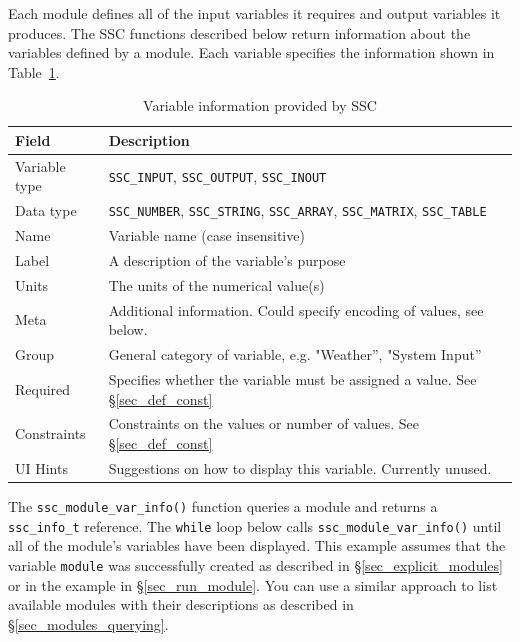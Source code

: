 \documentclass{scrartcl} %
\begin{document}
Each module defines all of the input variables it requires and output variables it produces. The SSC functions described below return information about the variables defined by a module. Each variable specifies the information shown in Table~\ref{tab_varinfo}.

\begin{table}[ht]
\begin{center}
\begin{tabular}{ll}
Field & Description\\
\hline
Variable type & \texttt{SSC\_INPUT}, \texttt{SSC\_OUTPUT}, \texttt{SSC\_INOUT} \\
Data type & \texttt{SSC\_NUMBER}, \texttt{SSC\_STRING}, \texttt{SSC\_ARRAY}, \texttt{SSC\_MATRIX}, \texttt{SSC\_TABLE} \\
Name & Variable name (case insensitive) \\
Label & A description of the variable's purpose \\
Units & The units of the numerical value(s) \\
Meta & Additional information. Could specify encoding of values, see below. \\
Group & General category of variable, e.g. "Weather'', "System Input'' \\
Required & Specifies whether the variable must be assigned a value. See \S\ref{sec_def_const} \\
Constraints & Constraints on the values or number of values. See \S\ref{sec_def_const} \\
UI Hints & Suggestions on how to display this variable.  Currently unused. \\
\end{tabular}
\caption{Variable information provided by SSC}
\label{tab_varinfo}
\end{center}
\end{table}

The \texttt{ssc\_module\_var\_info()} function queries a module and returns a \texttt{ssc\_info\_t} reference. The \texttt{while} loop below calls \texttt{ssc\_module\_var\_info()} until all of the module's variables have been displayed. This example assumes that the variable \texttt{module} was successfully created as described in \S\ref{sec_explicit_modules} or in the example in \S\ref{sec_run_module}. You can use a similar approach to list available modules with their descriptions as described in \S\ref{sec_modules_querying}.
\end{document}
